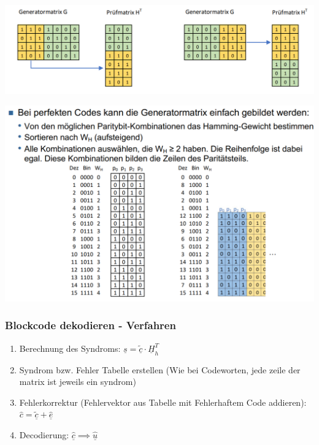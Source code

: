 \begin{center}
    \includegraphics[width=1\linewidth]{images/preufmatrix.png}
\end{center}

\begin{center}
    \includegraphics[width=1\linewidth]{images/bilgen.png}
\end{center}

\subsubsection{Blockcode dekodieren - Verfahren}%
\label{ssub:blockcode_dekodieren_verfahren}

\begin{enumerate}
    \item Berechnung des Syndroms: $\underline{s}=\underline{\tilde{c}} \cdot \underline{H}_h^T$
    \item Syndrom bzw. Fehler Tabelle erstellen (Wie bei Codeworten, jede zeile der matrix ist jeweils ein syndrom)
    \item Fehlerkorrektur (Fehlervektor aus Tabelle mit Fehlerhaftem Code addieren): $\hat{c} = \underline{\tilde{c}} + \underline{\hat{e}}$
    \item Decodierung: $\underline{\hat{c}} \implies \underline{\hat{u}}$
\end{enumerate}

